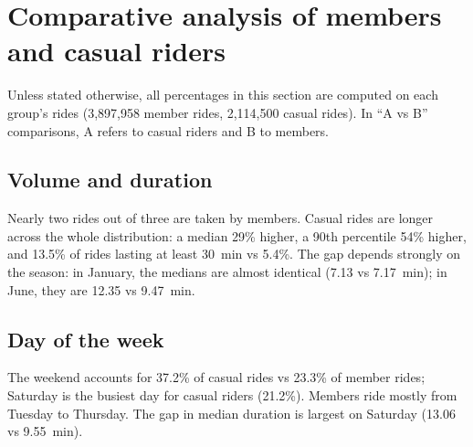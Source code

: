 \section{Comparative analysis of members and casual riders}
\label{sec:analysis}

Unless stated otherwise, all percentages in this section are computed on each group's rides (3,897,958 member rides, 2,114,500 casual rides). In ``A vs B'' comparisons, A refers to casual riders and B to members.

\subsection{Volume and duration}

\begin{table}[!htb]
\caption{Summary by rider type}
\label{tab:riders}
\small

\par{}
\end{table}

\Mes{} Nearly two rides out of three are taken by members. Casual rides are longer across the whole distribution: a median 29\% higher, a 90th percentile 54\% higher, and 13.5\% of rides lasting at least 30~min vs 5.4\%. The gap depends strongly on the season: in January, the medians are almost identical (7.13 vs 7.17~min); in June, they are 12.35 vs 9.47~min.

\subsection{Day of the week}

\begin{table}[!htb]
\caption{Distribution of rides and median duration by day of departure}
\label{tab:days}
\small

\par{}
\end{table}

\Mes{} The weekend accounts for 37.2\% of casual rides vs 23.3\% of member rides; Saturday is the busiest day for casual riders (21.2\%). Members ride mostly from Tuesday to Thursday. The gap in median duration is largest on Saturday (13.06 vs 9.55~min).

